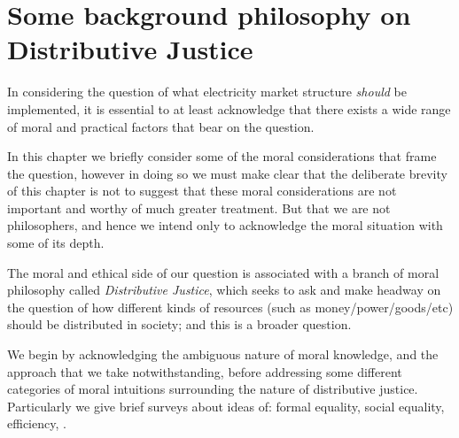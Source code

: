\chapter{Some background philosophy on Distributive Justice}
\label{cha:background}\label{sec:philosophy}


In considering the question of what electricity market structure \textit{should} be implemented, it is essential to at least acknowledge that there exists a wide range of moral and practical factors that bear on the question.

In this chapter we briefly consider some of the moral considerations that frame the question, however in doing so we must make clear that the deliberate brevity of this chapter is not to suggest that these moral considerations are not important and worthy of much greater treatment. But that we are not philosophers, and hence we intend only to acknowledge the moral situation with some of its depth.


The moral and ethical side of our question is associated with a branch of moral philosophy called \textit{Distributive Justice}, which seeks to ask and make headway on the question of how different kinds of resources (such as money/power/goods/etc) should be distributed in society; and this is \DIFdelbegin {}\DIFdelend a broader question.

We begin by acknowledging the ambiguous nature of moral knowledge, and the approach that we take notwithstanding, before addressing some different categories of moral intuitions surrounding the nature of distributive justice.
Particularly we give brief surveys about ideas of: formal equality, social equality, efficiency, \DIFdelbegin {}\DIFdelend \DIFaddbegin {}\DIFaddend .

